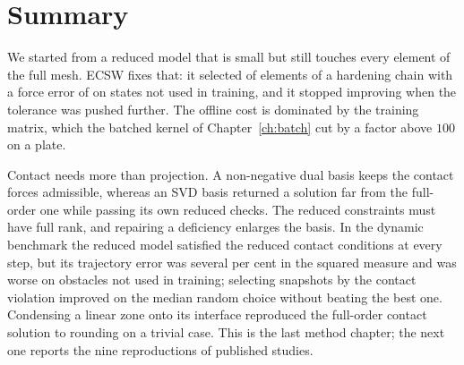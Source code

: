 \section{Summary}\label{sec:hy-summary}

We started from a reduced model that is small but still touches every element of the full mesh. ECSW fixes that: it selected \cecFourEN{} of \cecNElem{} elements of a hardening chain with a force error of \cecFourEErr{} on states not used in training, and it stopped improving when the tolerance was pushed further. The offline cost is dominated by the training matrix, which the batched kernel of Chapter~\ref{ch:batch} cut by a factor above $100$ on a plate.

Contact needs more than projection. A non-negative dual basis keeps the contact forces admissible, whereas an SVD basis returned a solution far from the full-order one while passing its own reduced checks. The reduced constraints must have full rank, and repairing a deficiency enlarges the basis. In the dynamic benchmark the reduced model satisfied the reduced contact conditions at every step, but its trajectory error was several per cent in the squared measure and was worse on obstacles not used in training; selecting snapshots by the contact violation improved on the median random choice without beating the best one. Condensing a linear zone onto its interface reproduced the full-order contact solution to rounding on a trivial case. This is the last method chapter; the next one reports the nine reproductions of published studies.

